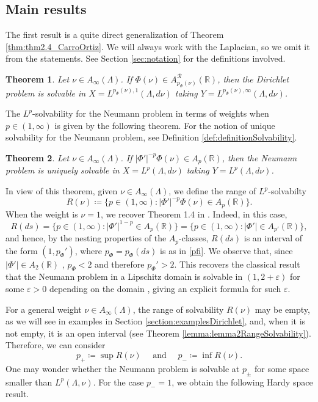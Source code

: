\documentclass[12pt]{amsart}
\newcommand{\R}{\mathbb{R}}
\theoremstyle{plain}
\newtheorem{theorem}{Theorem}[section]
\theoremstyle{definition}
\numberwithin{equation}{section}
\begin{document}
\subsection{Main results}


The first result is a quite direct generalization of Theorem \ref{thm:thm2.4_CarroOrtiz}. We will always work with the Laplacian, so we omit it from the statements. See Section \ref{sec:notation} for the definitions involved.

\begin{theorem}\label{thm:dirichletEndpointPesos}
    Let $\nu\in A_{\infty}(\Lambda)$. If $\Phi(\nu)\in A_{p_{\Phi}(\nu)}^{\mathcal{R}}(\R)$, then the Dirichlet problem is solvable in $X=L^{p_{\Phi}(\nu),1}(\Lambda,d\nu)$ taking $Y=L^{p_{\Phi}(\nu),\infty}(\Lambda,d\nu)$.
\end{theorem}

The $L^p$-solvability for the Neumann problem in terms of weights when $p\in (1,\infty)$ is given by the following theorem. For the notion of unique solvability for the Neumann problem, see Definition \ref{def:definitionSolvability}.
\begin{theorem}\label{thm:Lp_Solvability}
    Let $\nu\in A_{\infty}(\Lambda)$. If $|\Phi'|^{-p}\Phi(\nu)\in A_{p}(\R)$, then the Neumann problem is uniquely solvable in $X=L^p(\Lambda,d\nu)$ taking $Y=L^p(\Lambda,d\nu)$.
\end{theorem}
In view of this theorem, given $\nu\in A_{\infty}(\Lambda)$, we  define the range of $L^p$-solvabilty
\[
R(\nu)
\coloneqq 
\{ 
p\in (1,\infty): |\Phi'|^{-p}\Phi(\nu)\in A_p(\R)
\}.
\]
When the weight is $\nu=1$, we recover Theorem 1.4 in \cite{CNO}. Indeed, in this case, 
\[
R(ds)
=
\{p\in (1,\infty): |\Phi'|^{1-p}\in A_p(\R)\}
=
\{p\in (1,\infty): |\Phi'|\in A_{p'}(\R)\}, 
\]
and hence, by the nesting properties of the $A_p$-classes,  $R(ds)$ is an interval of the form $(1,p_{\Phi}')$, where $p_\Phi=p_\Phi(ds)$ is as in \eqref{pfi}. We observe that, since $|\Phi'|\in A_2(\R)$ \cite{calderonCauchyIntegral, kenigWeighted}, $p_{\Phi}<2$ and therefore $p_{\Phi}'>2$. This recovers the classical result that the Neumann problem in a Lipschitz domain is solvable in $(1,2+\varepsilon)$ for some $\varepsilon>0$ depending on the domain \cite{DahlbergKenig}, giving an explicit formula for such $\varepsilon$. 

For a general weight $\nu\in A_{\infty}(\Lambda)$, the range of solvability $R(\nu)$ may be empty, as we will see in examples in Section \ref{section:examplesDirichlet}, and, when it is not empty, it is an open interval (see Theorem \ref{lemma:lemma2RangeSolvability}). Therefore, we can consider
\[
p_{+}\coloneqq \sup R(\nu)\quad \text{ and }\quad p_{-}\coloneqq \inf R(\nu).
\]
One may wonder whether the Neumann problem is solvable at $p_{\pm}$ for some space smaller than $L^p(\Lambda,\nu)$. For the case $p_-=1$,  we obtain the following Hardy space result.
\end{document}
